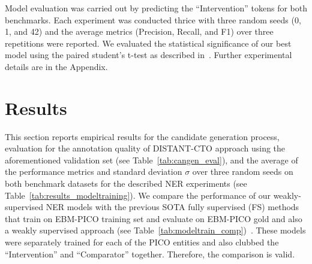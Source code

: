 \documentclass[11pt]{article}
\begin{document}
Model evaluation was carried out by predicting the ``Intervention'' tokens for both benchmarks.
Each experiment was conducted thrice with three random seeds (0, 1, and 42) and the average metrics (Precision, Recall, and F1) over three repetitions were reported.
We evaluated the statistical significance of our best model using the paired student's t-test as described in~\cite{dror2018hitchhiker}.
Further experimental details are in the Appendix.
%
%
%
\section{Results}
\label{sec:results}
%
This section reports empirical results for the candidate generation process, evaluation for the annotation quality of DISTANT-CTO approach using the aforementioned validation set (see Table~\ref{tab:cangen_eval}), and the average of the performance metrics and standard deviation $\sigma$ over three random seeds on both benchmark datasets for the described NER experiments (see Table~\ref{tab:results_modeltraining}).
We compare the performance of our weakly-supervised NER models with the previous SOTA fully supervised (FS) methods that train on EBM-PICO training set and evaluate on EBM-PICO gold and also a weakly supervised approach  (see Table~\ref{tab:modeltrain_comp})~\cite{liu2021sent2span}.
These models were separately trained for each of the PICO entities and also clubbed the ``Intervention'' and ``Comparator'' together.
Therefore, the comparison is valid.
%
%
%
\end{document}
